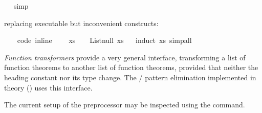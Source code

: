 \begin{isabellebody}
\begin{itemize}
\isadelimproof
\ %
\endisadelimproof
%
\isatagproof
{}\isamarkupfalse%
\ simp%
\endisatagproof
{\isafoldproof}%
%
\isadelimproof
%
\endisadelimproof
%
\begin{isamarkuptext}%
\item replacing executable but inconvenient constructs:%
\end{isamarkuptext}%
\isamarkuptrue%
\ \ \isamarkupfalse%
\ {\isacharbrackleft}code\ inline{\isacharbrackright}{\isacharcolon}\isanewline
\ \ \ \ {\isachardoublequoteopen}xs\ {\isacharequal}\ {\isacharbrackleft}{\isacharbrackright}\ {\isasymlongleftrightarrow}\ List{\isachardot}null\ xs{\isachardoublequoteclose}%
\isadelimproof
\ %
\endisadelimproof
%
\isatagproof
{}\isamarkupfalse%
\ {\isacharparenleft}induct\ xs{\isacharparenright}\ simp{\isacharunderscore}all%
\endisatagproof
{\isafoldproof}%
%
\isadelimproof
%
\endisadelimproof
%
\end{itemize}
%
\begin{isamarkuptext}%
\emph{Function transformers} provide a very general interface,
  transforming a list of function theorems to another
  list of function theorems, provided that neither the heading
  constant nor its type change.  The  / 
  pattern elimination implemented in
  theory  () uses this
  interface.

  \noindent The current setup of the preprocessor may be inspected using
  the \isa{{\isasymPRINTCODESETUP}} command.


\end{isamarkuptext}
\end{isabellebody}
